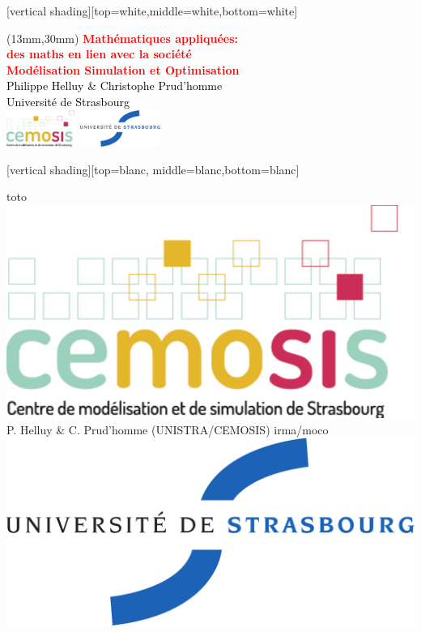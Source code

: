 \documentclass[slideopt,A4]{beamer}
\begin{document}
[vertical shading][top=white,middle=white,bottom=white]



\begin{frame}

\begin{textblock*}{15cm}(13mm,30mm)
{\textcolor{red} {
{\huge\bf Mathématiques appliquées: }\\[2mm]
{\huge\bf  des maths en lien avec la société}\\[2mm]
{\bf Modélisation Simulation et Optimisation}\\[8mm] }}
{\textcolor{black} {
   	{\Large Philippe Helluy \& Christophe Prud'homme}\\[2mm]
	{\Large Université de Strasbourg}\\[2mm]
        \includegraphics[height=1.2cm]{LOGOS/logoCemosis}	\hspace*{40mm}	
        \includegraphics[height=1.2cm]{LOGOS/logoUDS}\\
      }}
\end{textblock*}

\end{frame}



[vertical shading][top=blanc, middle=blanc,bottom=blanc]


{
\begin{beamercolorbox}[wd=1\paperwidth,ht=15.5pt]{toto}
\hspace{-1.6mm}	
  \raisebox{1.2ex}
  {  \includegraphics[height=.6cm]{LOGOS/logoCemosis}}
  \raisebox{2.5ex}
 { P. Helluy \& C. Prud'homme (UNISTRA/CEMOSIS)  }
\hspace{\fill}	
  \raisebox{2.5ex}
 { irma/moco }
  \raisebox{1ex}
{  \includegraphics[height=.6cm]{LOGOS/logoUDS}}
\end{beamercolorbox} 
}
\end{document}
